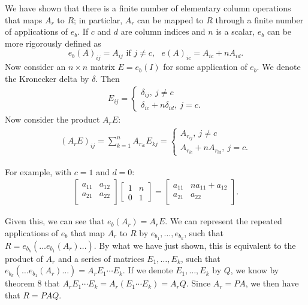 \documentclass[12pt]{article}
\begin{document}
\begin{enumerate}
    We have shown that there is a finite number of elementary
    column operations that maps $A_r$ to $R$; in particlar, $A_r$
    can be mapped to $R$ through a finite number of applications
    of $e_b$. If $c$ and $d$ are column indices and $n$ is a
    scalar, $e_b$ can be more rigorously defined as
    \begin{equation*}
      e_b(A)_{ij} = A_{ij} \text{ if } j \neq c,\text{ }e(A)_{ic} =
      A_{ic} + nA_{id}.
    \end{equation*}
    Now consider an $n \times n$ matrix $E = e_b(I)$ for some
    application of $e_b$. We denote the Kronecker delta by
    $\delta$. Then
    \begin{align*}
      E_{ij} =
      \begin{cases}
        \delta_{ij},\ j \neq c\\
        \delta_{ic} + n\delta_{id},\ j = c.
      \end{cases}
    \end{align*}
    Now consider the product $A_rE$:
    \begin{align*}
      (A_rE)_{ij} = \sum_{k = 1}^{n}A_{r_{ik}}E_{kj} =
      \begin{cases}
        A_{r_{ij}},\ j \neq c\\
        A_{r_{ic}} + nA_{r_{id}},\ j = c.
      \end{cases}
    \end{align*}

    For example, with $c = 1$ and $d = 0$:
    \begin{align*}
      \begin{bmatrix}
        a_{11} & a_{12}\\
        a_{21} & a_{22}\\
      \end{bmatrix}
      \begin{bmatrix}
        1 & n\\
        0 & 1
      \end{bmatrix}
      =
      \begin{bmatrix}
        a_{11} & na_{11} + a_{12}\\
        a_{21} & a_{22}\\
      \end{bmatrix}.
    \end{align*}

    Given this, we can see that $e_b(A_r) = A_rE$. We can
    represent the repeated applications of $e_b$ that map $A_r$
    to $R$ by $e_{b_1},\ldots,e_{b_k}$, such that $R =
    e_{b_k}(\ldots e_{b_1}(A_r)\ldots)$. By what we have just
    shown, this is equivalent to the product of $A_r$ and a
    series of matrices $E_1,\ldots,E_k$, such that
    $e_{b_k}(\ldots e_{b_1}(A_r)\ldots) = A_rE_1\cdots E_k$. If
    we denote $E_1,\ldots,E_k$ by $Q$, we know by theorem 8 that
    $A_rE_1\cdots E_k = A_r(E_1\cdots E_k) = A_rQ$. Since $A_r =
    PA$, we then have that $R = PAQ$.


\end{enumerate}
\end{document}
